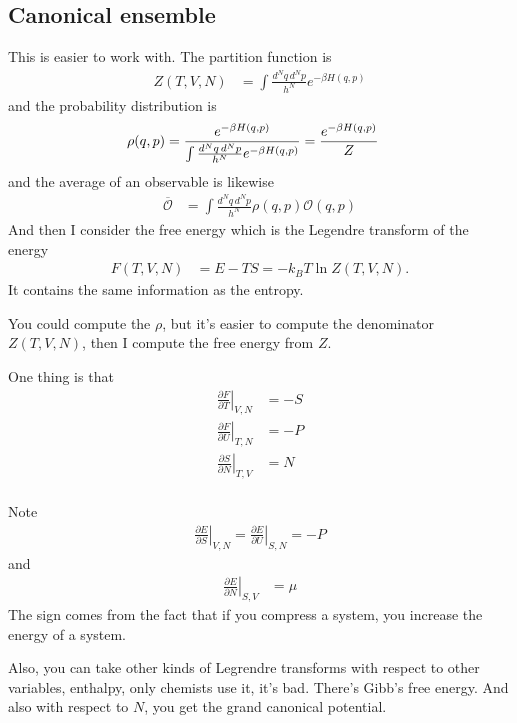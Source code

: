 \subsection{Canonical ensemble}
This is easier to work with.
The partition function is
\begin{align}
    Z(T,V,N) &=
    \int \frac{d^Nq\, d^Np}{h^N} e^{-\beta H(q,p)}
\end{align}
and the probability distribution is
\begin{align}
    \rho(q, p) &=
    \frac{e^{-\beta H(q, p)}}{%
    \int \frac{d^Nq\, d^Np}{h^N} e^{-\beta H(q,p)}
    }
    =
    \frac{e^{-\beta H(q, p)}}{%
    Z
    }
\end{align}
and the average of an observable is likewise
\begin{align}
    \overline{\mathcal{O}}
    &=
    \int \frac{d^Nq \, d^Np}{h^N}
    \rho(q, p) \mathcal{O}(q, p)
\end{align}
And then I consider the free energy which is the Legendre transform of the
energy
\begin{align}
    F(T,V,N) &= E - TS = -k_B T \ln Z(T, V, N).
\end{align}
It contains the same information as the entropy.

You could compute the $\rho$,
but it's easier to compute the denominator $Z(T,V,N)$,
then I compute the free energy from $Z$.

One thing is that
\begin{align}
    \left. \frac{\partial F}{\partial T}\right|_{V,N} &= -S\\
    \left. \frac{\partial F}{\partial U}\right|_{T,N} &= -P\\
    \left. \frac{\partial S}{\partial N}\right|_{T,V} &= N\\
\end{align}

Note
\begin{align}
    \left.\frac{\partial E}{\partial S}\right|_{V,N}
    =
    \left.\frac{\partial E}{\partial U}\right|_{S,N}
    = -P
\end{align}
and
\begin{align}
    \left.\frac{\partial E}{\partial N}\right|_{S,V} &= \mu
\end{align}
The sign comes from the fact that if you compress a system,
you increase the energy of a system.

Also,
you can take other kinds of Legrendre transforms with respect to other
variables,
enthalpy,
only chemists use it,
it's bad.
There's Gibb's free energy.
And also with respect to $N$,
you get the grand canonical potential.

